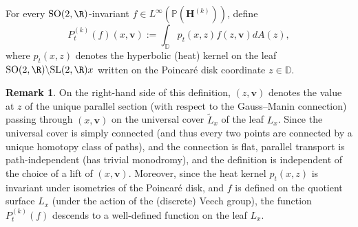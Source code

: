\documentclass[10pt]{amsart}
\theoremstyle{plain}
\theoremstyle{definition}
\newtheorem{rem}[thm]{Remark}
\numberwithin{equation}{subsection}
\newcommand\bD{\mathbb{D}}
\newcommand\bP{\mathbb{P}}
\newcommand{\SL}{\mathrm{SL}}
\newcommand{\SO}{\mathrm{SO}}
\newcommand{\bfH}{\boldsymbol{H}}
\newcommand{\bfv}{\boldsymbol{v}}
\begin{document}
For every $\SO(2, \R)$-invariant $f \in L^\infty(\bP(\bfH^{(k)}))$, define
\[
P^{(k)}_t(f) (x,\bfv) := \int_{\bD} p_t(x,z) f(z,\bfv) dA(z),
\]
where $p_t(x,z)$ denotes the hyperbolic (heat) kernel
on the leaf $\SO(2, \R) \backslash \SL(2,\R)x$ written on the Poincaré disk coordinate $z \in \bD$.
\begin{rem} On the right-hand side of this definition, $(z, \bfv)$ denotes the value at $z$ of the unique parallel section (with respect to the Gauss--Manin connection) passing through $(x, \bfv)$ on the universal cover $\widetilde{L}_x$ of the leaf $L_x$. Since the universal cover is simply connected (and thus every two points are connected by a unique homotopy class of paths), and the connection is flat, parallel transport is path-independent (\ie has trivial monodromy), and the definition is independent of the choice of a lift of \((x, \bfv)\). Moreover, since the heat kernel \(p_t(x, z)\) is invariant under isometries of the Poincaré disk, and $f$ is defined on the quotient surface $L_x$ (under the action of the (discrete) Veech group), the function $P_t^{(k)}(f)$ descends to a well-defined function on the leaf $L_x$.
\end{rem}
\end{document}
